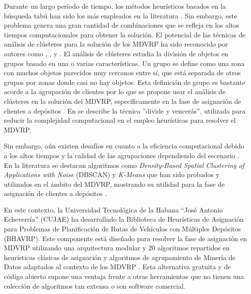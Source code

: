 Durante un largo período de tiempo, los métodos heurísticos basados en la búsqueda tabú han sido los más empleados en la literatura \parencite{mateosDESARROLLOMETODOHIBRIDO2013}. Sin embargo, este problema genera una gran cantidad de combinaciones que se refleja en los altos tiempos computacionales para obtener la solución. El potencial de las técnicas de análisis de clústeres para la solución de los MDVRP ha sido reconocido por autores como \parencite{g.b.dantzigTruckDispatchingProblem1959}, \parencite{bermudezAplicacionTecnicasClusterizacion}, \parencite{barretoUsingClusteringAnalysis2007} y \parencite{mehrjerdiUsingGreedyClustering2013}. El análisis de clústeres estudia la división de objetos en grupos basado en una o varias características. Un grupo se define como una zona con muchos objetos parecidos muy cercanos entre sí, que está separada de otros grupos por zonas donde casi no hay objetos. Esta definición de grupo es bastante acorde a la agrupación de clientes por lo que se propone usar el análisis de clústeres en la solución del MDVRP, específicamente en la fase de asignación de clientes a depósitos \parencite{bermudezAplicacionTecnicasClusterizacion}. En \parencite{jainAlgorithmsClusteringData1988} se describe la técnica ''divide y vencerás'', utilizada para reducir la complejidad computacional en el empleo heurísticas para resolver el MDVRP.

Sin embargo, aún existen desafíos en cuanto a la eficiencia computacional debido a los altos tiempos y la calidad de las agrupaciones dependiendo del escenario \parencite{bermudezAplicacionTecnicasClusterizacion}. En la literatura se destacan algoritmos como \textit{Density-Based Spatial Clustering of Applications with Noise} (DBSCAN)\parencite{khanDBSCANPresentFuture2014} y \textit{K-Means}\parencite{macqueen1967some} que han sido probados y utilizados en el ámbito del MDVRP, mostrando su utilidad para la fase de asignación de clientes a depósitos  \parencite{padulohRobustOptimizingReverse2023, luo2014multi, geetha2013nested}.

En este contexto, la Universidad Tecnológica de la Habana ``José Antonio Echeverría'' (CUJAE) ha desarrollado la Biblioteca de Heurísticas de Asignación para Problemas de Planificación de Rutas de Vehículos con Múltiples Depósitos (BHAVRP). Este componente está dise\~nado para resolver la fase de asignación en MDVRP utilizando una arquitectura modular y 20 algoritmos repartidos en heurísticas clásicas de asignación y algoritmos de agrupamiento de Minería de Datos adaptados al contexto de los MDVRP \parencite{GitHubVrpsolutionsBHAVRP2026}. Esta alternativa gratuita y de código abierto supone una ventaja frente a otras herramientas que no tienen una colección de algoritmos tan extensa o son software comercial.

